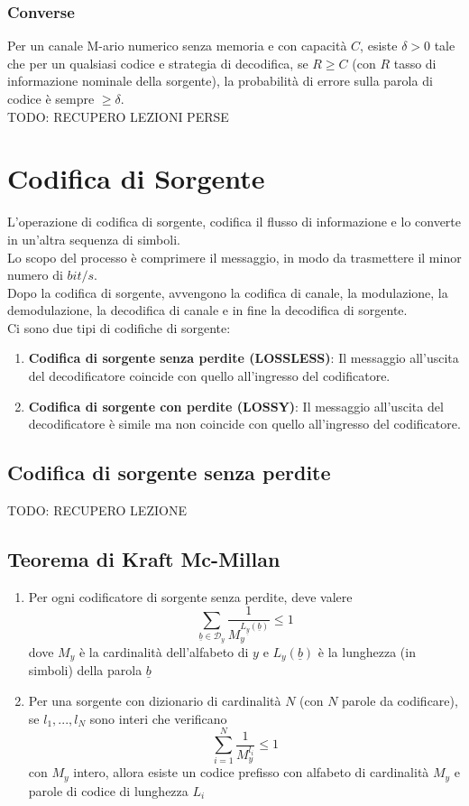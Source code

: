 \documentclass{article}
\begin{document}
\subsubsection{Converse}
Per un canale M-ario numerico senza memoria e con capacità $C$, esiste $\delta>0$ tale che per un qualsiasi codice e strategia di decodifica, se $R\geq C$ (con $R$ tasso di informazione nominale della sorgente), la probabilità di errore sulla parola di codice è sempre $\geq\delta$.\\
TODO: RECUPERO LEZIONI PERSE







\newpage
\section{Codifica di Sorgente}
L'operazione di codifica di sorgente, codifica il flusso di informazione e lo converte in un'altra sequenza di simboli.\\
Lo scopo del processo è comprimere il messaggio, in modo da trasmettere il minor numero di $bit/s$.\\
Dopo la codifica di sorgente, avvengono la codifica di canale, la modulazione, la demodulazione, la decodifica di canale e in fine la decodifica di sorgente.\\
Ci sono due tipi di codifiche di sorgente:
\begin{enumerate}
	\item \textbf{Codifica di sorgente senza perdite (LOSSLESS)}: Il messaggio all'uscita del decodificatore coincide con quello all'ingresso del codificatore.
	\item \textbf{Codifica di sorgente con perdite (LOSSY)}: Il messaggio all'uscita del decodificatore è simile ma non coincide con quello all'ingresso del codificatore.
\end{enumerate}

\subsection{Codifica di sorgente senza perdite}

TODO: RECUPERO LEZIONE

\subsection{Teorema di Kraft Mc-Millan}
\begin{enumerate}
	\item Per ogni codificatore di sorgente senza perdite, deve valere $$\sum_{\underline{b}\in\mathcal{D}_y}\frac{1}{M_y^{L_{\underline{y}}(\underline{b})}}\leq 1$$ dove $M_y$ è la cardinalità dell'alfabeto di $y$ e $L_y(\underline{b})$ è la lunghezza (in simboli) della parola $\underline{b}$
	\item Per una sorgente con dizionario di cardinalità $N$ (con $N$ parole da codificare), se $l_1,...,l_N$ sono interi che verificano $$\sum_{i=1}^N\frac{1}{M_y^{l_i}}\leq 1$$ con $M_y$ intero, allora esiste un codice prefisso con alfabeto di cardinalità $M_y$ e parole di codice di lunghezza $L_i$
\end{enumerate}
\end{document}
